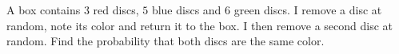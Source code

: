 A box contains $3$ red discs, $5$ blue discs and $6$ green discs. I remove a disc at random, note its color and return it to the box. I then remove a second disc at random. Find the probability that both discs are the same color.

